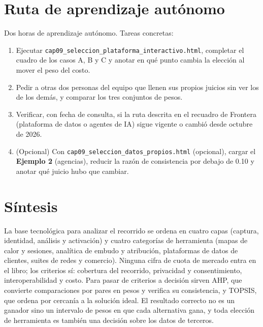 \section{Ruta de aprendizaje autónomo}

Dos horas de aprendizaje autónomo. Tareas concretas:
\begin{enumerate}
  \item Ejecutar \texttt{cap09\_seleccion\_plataforma\_interactivo.html},
  completar el cuadro de los casos A, B y C y anotar en qué punto cambia la
  elección al mover el peso del costo.
  \item Pedir a otras dos personas del equipo que llenen sus propios juicios
  sin ver los de los demás, y comparar los tres conjuntos de pesos.
  \item Verificar, con fecha de consulta, si la ruta descrita en el recuadro de
  Frontera (plataforma de datos o agentes de IA) sigue vigente o cambió
  desde octubre de 2026.
  \item (Opcional) Con \texttt{cap09\_seleccion\_datos\_propios.html} (opcional), cargar el \textbf{Ejemplo 2} (agencias), reducir la razón de consistencia por debajo de 0.10 y anotar qué juicio hubo que cambiar.
\end{enumerate}

\section{Síntesis}

La base tecnológica para analizar el recorrido se ordena en cuatro capas
(captura, identidad, análisis y activación) y cuatro categorías de herramienta
(mapas de calor y sesiones, analítica de embudo y atribución, plataformas de
datos de clientes, suites de redes y comercio). Ninguna cifra de cuota de
mercado entra en el libro; los criterios sí: cobertura del recorrido,
privacidad y consentimiento, interoperabilidad y costo. Para pasar de criterios
a decisión sirven AHP, que convierte comparaciones por pares en pesos y
verifica su consistencia, y TOPSIS, que ordena por cercanía a la solución ideal.
El resultado correcto no es un ganador sino un intervalo de pesos en que cada
alternativa gana, y toda elección de herramienta es también una decisión
sobre los datos de terceros.

